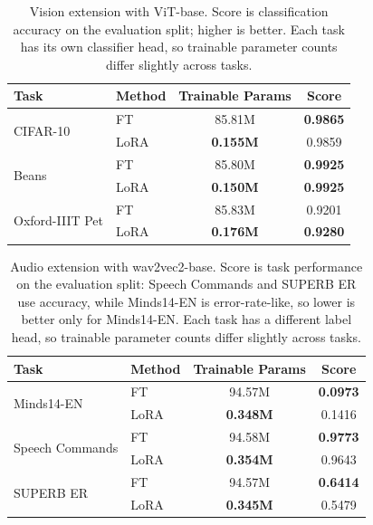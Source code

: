 \documentclass[11pt]{article}
\begin{document}
\begin{table}[h]
\centering
\small
\begin{tabular}{llcc}
\toprule
Task & Method & Trainable Params & Score \\
\midrule
\multirow{2}{*}{CIFAR-10} & FT & 85.81M & \textbf{0.9865} \\
 & LoRA & \textbf{0.155M} & 0.9859 \\
\cmidrule(lr){1-4}
\multirow{2}{*}{Beans} & FT & 85.80M & \textbf{0.9925} \\
 & LoRA & \textbf{0.150M} & \textbf{0.9925} \\
\cmidrule(lr){1-4}
\multirow{2}{*}{Oxford-IIIT Pet} & FT & 85.83M & 0.9201 \\
 & LoRA & \textbf{0.176M} & \textbf{0.9280} \\
\bottomrule
\end{tabular}
\caption{Vision extension with ViT-base. Score is classification accuracy on the evaluation split; higher is better. Each task has its own classifier head, so trainable parameter counts differ slightly across tasks.}
\label{tab:vision}
\end{table}

\begin{table}[h]
\centering
\small
\begin{tabular}{llcc}
\toprule
Task & Method & Trainable Params & Score \\
\midrule
\multirow{2}{*}{Minds14-EN} & FT & 94.57M & \textbf{0.0973} \\
 & LoRA & \textbf{0.348M} & 0.1416 \\
\cmidrule(lr){1-4}
\multirow{2}{*}{Speech Commands} & FT & 94.58M & \textbf{0.9773} \\
 & LoRA & \textbf{0.354M} & 0.9643 \\
\cmidrule(lr){1-4}
\multirow{2}{*}{SUPERB ER} & FT & 94.57M & \textbf{0.6414} \\
 & LoRA & \textbf{0.345M} & 0.5479 \\
\bottomrule
\end{tabular}
\caption{Audio extension with wav2vec2-base. Score is task performance on the evaluation split: Speech Commands and SUPERB ER use accuracy, while Minds14-EN is error-rate-like, so lower is better only for Minds14-EN. Each task has a different label head, so trainable parameter counts differ slightly across tasks.}
\label{tab:audio}
\end{table}
\end{document}
